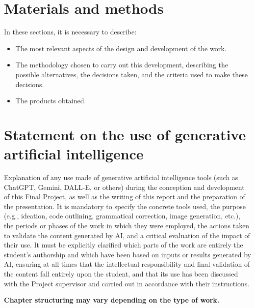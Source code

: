 \documentclass[ENG,BIB]{TFUOC}%
\begin{document}



\chapter{Materials and methods}
In these sections, it is necessary to describe:
\begin{itemize}
    \item The most relevant aspects of the design and development of the work.
    \item The methodology chosen to carry out this development, describing the possible alternatives, the decisions taken, and the criteria used to make these decisions.
    \item The products obtained.
\end{itemize}

\chapter{Statement on the use of generative artificial intelligence}

Explanation of any use made of generative artificial intelligence tools (such as ChatGPT, Gemini, DALL-E, or others) during the conception and development of this Final Project, as well as the writing of this report and the preparation of the presentation. It is mandatory to specify the concrete tools used, the purpose (e.g., ideation, code outlining, grammatical correction, image generation, etc.), the periods or phases of the work in which they were employed, the actions taken to validate the content generated by AI, and a critical evaluation of the impact of their use. It must be explicitly clarified which parts of the work are entirely the student's authorship and which have been based on inputs or results generated by AI, ensuring at all times that the intellectual responsibility and final validation of the content fall entirely upon the student, and that its use has been discussed with the Project supervisor and carried out in accordance with their instructions.


 
\textbf{Chapter structuring may vary depending on the type of work.}  
 
\end{document}

